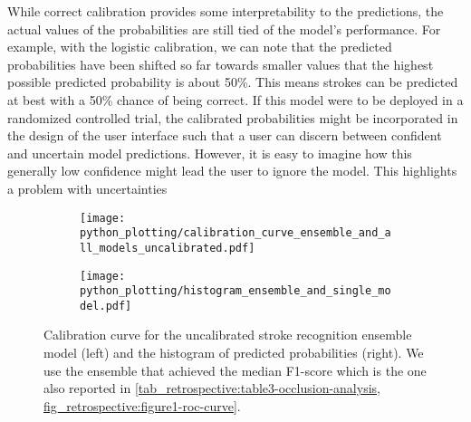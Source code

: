 While correct calibration provides some interpretability to the predictions, the actual values of the probabilities are still tied of the model's performance. For example, with the logistic calibration, we can note that the predicted probabilities have been shifted so far towards smaller values that the highest possible predicted probability is about 50\%. This means strokes can be predicted at best with a 50\% chance of being correct. 
If this model were to be deployed in a randomized controlled trial, the calibrated probabilities might be incorporated in the design of the user interface such that a user can discern between confident and uncertain model predictions. However, it is easy to imagine how this generally low confidence might lead the user to ignore the model. This highlights a problem with uncertainties


\begin{figure}
    \begin{subfigure}[c]{0.48\columnwidth}
        \centering
        \texttt{[image: python\_plotting/calibration\_curve\_ensemble\_and\_all\_models\_uncalibrated.pdf]}
    \end{subfigure}
    \begin{subfigure}[c]{0.48\columnwidth}
        \centering
        \texttt{[image: python\_plotting/histogram\_ensemble\_and\_single\_model.pdf]}
    \end{subfigure}
    \caption[Calibration curve for the uncalibrated stroke recognition model and empirical distribution of predicted probabilities.]{%
        Calibration curve for the uncalibrated stroke recognition ensemble model (left) and the histogram of predicted probabilities (right). 
        We use the ensemble that achieved the median F1-score which is the one also reported in \cref{tab_retrospective:table3-occlusion-analysis, fig_retrospective:figure1-roc-curve}.
    }
    \label{fig_discussion:retrospective-paper-calibration-curve-of-uncalibrated-model}
\end{figure}

